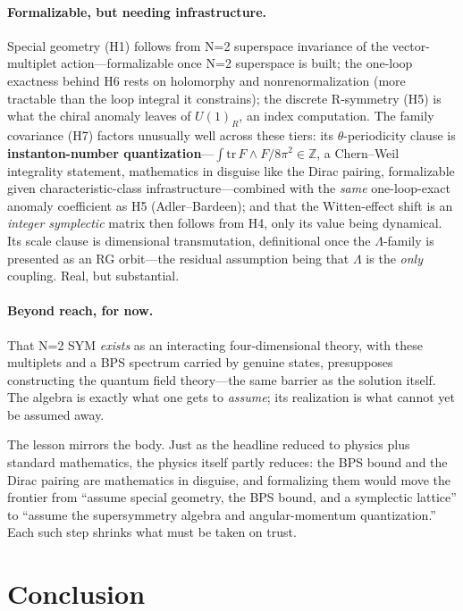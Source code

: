 \documentclass{article}
\theoremstyle{plain}
\theoremstyle{definition}
\numberwithin{equation}{section}
\newcommand{\Z}{\mathbb{Z}}
\begin{document}
\paragraph{Formalizable, but needing infrastructure.} Special geometry (H1) follows from N=2
superspace invariance of the vector-multiplet action---formalizable once N=2 superspace is built;
the one-loop exactness behind H6 rests on holomorphy and nonrenormalization (more tractable than the
loop integral it constrains); the discrete R-symmetry (H5) is what the chiral anomaly leaves of
$U(1)_R$, an index computation. The family covariance (H7) factors unusually well across these
tiers: its $\theta$-periodicity clause is \textbf{instanton-number quantization}---$\int
\mathrm{tr}\,F\wedge F/8\pi^2 \in \Z$, a Chern--Weil integrality statement, mathematics in
disguise like the Dirac pairing, formalizable given characteristic-class infrastructure---combined
with the \emph{same} one-loop-exact anomaly coefficient as H5 (Adler--Bardeen); and that the
Witten-effect shift is an \emph{integer symplectic} matrix then follows from H4, only its value
being dynamical. Its scale clause is dimensional transmutation, definitional once the
$\Lambda$-family is presented as an RG orbit---the residual assumption being that $\Lambda$ is
the \emph{only} coupling. Real, but substantial.

\paragraph{Beyond reach, for now.} That N=2 SYM \emph{exists} as an interacting four-dimensional
theory, with these multiplets and a BPS spectrum carried by genuine states, presupposes constructing
the quantum field theory---the same barrier as the solution itself. The algebra is exactly what one
gets to \emph{assume}; its realization is what cannot yet be assumed away.

\medskip
The lesson mirrors the body. Just as the headline reduced to physics plus standard mathematics, the
physics itself partly reduces: the BPS bound and the Dirac pairing are mathematics in disguise, and
formalizing them would move the frontier from ``assume special geometry, the BPS bound, and a
symplectic lattice'' to ``assume the supersymmetry algebra and angular-momentum quantization.'' Each
such step shrinks what must be taken on trust.

\section{Conclusion}
\end{document}
